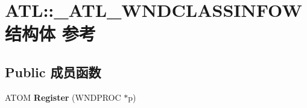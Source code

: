\hypertarget{struct_a_t_l_1_1___a_t_l___w_n_d_c_l_a_s_s_i_n_f_o_w}{}\section{A\+TL\+:\+:\+\_\+\+A\+T\+L\+\_\+\+W\+N\+D\+C\+L\+A\+S\+S\+I\+N\+F\+O\+W结构体 参考}
\label{struct_a_t_l_1_1___a_t_l___w_n_d_c_l_a_s_s_i_n_f_o_w}
\subsection*{Public 成员函数}
\begin{DoxyCompactItemize}
\item 
\mbox{\label{struct_a_t_l_1_1___a_t_l___w_n_d_c_l_a_s_s_i_n_f_o_w_a99e4121203ff17d8f31eb2109cc35573}} 
A\+T\+OM {\bfseries Register} (W\+N\+D\+P\+R\+OC $\ast$p)
\end{DoxyCompactItemize}
